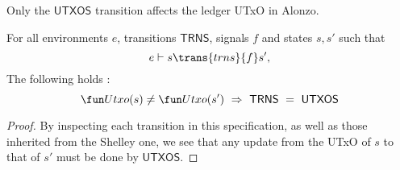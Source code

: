 \begin{property}
  \label{prop:utxo-change}

Only the $\mathsf{UTXOS}$ transition affects the ledger UTxO in Alonzo.

\begin{lemma}
  For all environments $e$, transitions $\mathsf{TRNS}$, signals $f$ and states $s, s'$ such that
  \begin{equation*}
    e\vdash s\trans{trns}{f}s',
  \end{equation*}
  The following holds :
  \begin{equation*}
    \Utxo(s) \neq \Utxo (s')~ \Rightarrow~\mathsf{TRNS}~=~\mathsf{UTXOS}
  \end{equation*}
\end{lemma}
\begin{proof}
  By inspecting each transition in this specification, as well as those inherited from the
  Shelley one, we see that any update from the UTxO of $s$ to that of $s'$
  must be done by $\mathsf{UTXOS}$.
\end{proof}
\end{property}

